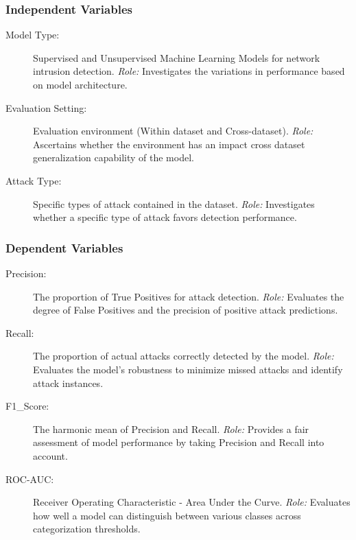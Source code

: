 \subsubsection{Independent Variables}
\begin{description}
    \item[Model Type:] Supervised and Unsupervised Machine Learning Models for network intrusion detection.
    \textit{Role:} Investigates the variations in performance based on model architecture.
    \item[Evaluation Setting:] Evaluation environment (Within dataset and Cross-dataset).
    \textit{Role:} Ascertains whether the environment has an impact cross dataset generalization capability of the model.
    \item[Attack Type:] Specific types of attack contained in the dataset.
    \textit{Role:} Investigates whether a specific type of attack favors detection performance.
\end{description}

\subsubsection{Dependent Variables}
\begin{description}
    \item[Precision:] The proportion of True Positives for attack detection.
    \textit{Role:} Evaluates the degree of False Positives and the precision of positive attack predictions.
    \item[Recall:] The proportion of actual attacks correctly detected by the model.
    \textit{Role:} Evaluates the model's robustness to minimize missed attacks and identify attack instances. 
    \item[F1\_Score:] The harmonic mean of Precision and Recall.
    \textit{Role:} Provides a fair assessment of model performance by taking Precision and Recall into account.
    \item[ROC-AUC:] Receiver Operating Characteristic - Area Under the Curve.
    \textit{Role:} Evaluates how well a model can distinguish between various classes across categorization thresholds.
\end{description}

